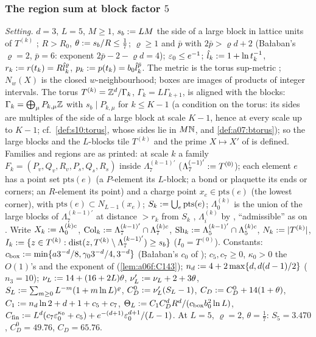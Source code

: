 
\subsubsection*{The region sum \cite[(3.42), Sect.~3C]{Ba2} at block factor $5$}

\emph{Setting.} $d=3$, $L=5$, $M\ge1$, $s_b:= LM$ the side of a large block in lattice units of $T^{(k)}$ \cite[p.~607]{Ba1}; $R>R_0$, $\theta:= s_b/R\le\frac17$; $\varrho\ge1$ and $\bar p$ with $2\bar p>\varrho d+2$ (Ba{\l}aban's $\varrho=2$, $\bar p=6$: exponent $2\bar p-2-\varrho d=4$); $\varepsilon_0\le e^{-1}$; $\hat l_k:=1+\ln t_k^{-1}$, $r_k:= r(t_k)=R\hat l_k^\varrho$, $p_k:= p(t_k)=b_0\hat l_k^{\bar p}$. The metric is the torus sup-metric \cite[(1.3)]{Ba1}; $N_w(X)$ is the closed $w$-neighbourhood; boxes are images of products of integer intervals. The torus $T^{(k)}=\mathbb Z^d/\Gamma_k$, $\Gamma_k=L\Gamma_{k+1}$, is aligned with the blocks: $\Gamma_k=\bigoplus_\mu P_{k,\mu}\mathbb Z$ with $s_b\mid P_{k,\mu}$ for $k\le K-1$ (a condition on the torus: its sides are multiples of the side of a large block at scale $K-1$, hence at every scale up to $K-1$; cf.\ \cref{def:s10:torus}, whose sides lie in $M\mathbb N$, and \cref{def:a07:btorus}); so the large blocks and the $L$-blocks tile $T^{(k)}$ and the prime $X\mapsto X'$ of \cite[(1.16)]{Ba1} is defined. Families and regions are as printed: at scale $k$ a family $F_k=(P_v,Q_v,R_v,P_s,Q_s,R_s)$ inside $\Lambda^{(k-1)'}_7$ ($\Lambda^{(-1)'}_7:= T^{(0)}$); each element $e$ has a point set $\mathrm{pts}(e)$ (a $P$-element its $L$-block; a bond or plaquette its ends or corners; an $R$-element its point) and a charge point $x_e\in\mathrm{pts}(e)$ (the lowest corner), with $\mathrm{pts}(e)\subset N_{L-1}(x_e)$; $S_k:=\bigcup_e\mathrm{pts}(e)$; $\Lambda^{(k)}_0$ is the union of the large blocks of $\Lambda^{(k-1)'}_7$ at distance $>r_k$ from $S_k$ \cite[p.~570]{Ba2}, $\Lambda^{(k)}_i$ by \cite[(2.8)]{Ba2}, ``admissible'' as on \cite[p.~566]{Ba2}. Write $X_k:=\Lambda^{(k)c}_0$, $\mathrm{Col}_k:=\Lambda^{(k-1)'}_7\cap\Lambda^{(k)c}_7$, $\mathrm{Sh}_k:=\Lambda^{(k-1)'}_5\cap\Lambda^{(k)c}_5$, $N_k:=|T^{(k)}|$, $I_k:=\{z\in T^{(k)}:\operatorname{dist}(z,T^{(k)}\setminus\Lambda^{(k-1)'}_7)\ge s_b\}$ ($I_0=T^{(0)}$). Constants: $c_{\mathrm{box}}:=\min\{a3^{-d}/8,\gamma_03^{-d}/4,3^{-d}\}$ (Ba{\l}aban's $c_0$ of \cite[p.~593]{Ba2}); $c_5,c_7\ge0$, $\kappa_0>0$ the $O(1)$'s and the exponent of \cite[(3.42)]{Ba2} (\cref{lem:a06f:C143}); $n_d:=4+2\max\{d,d(d-1)/2\}$ ($n_3=10$); $\nu_L:=14+(16+2L)\theta$, $\nu'_L:=\nu_L+2+3\theta$, $S_L:=\sum_{m\ge0}L^{-m}(1+m\ln L)^\varrho$, $C^0_D:=\nu'_L(S_L-1)$, $C_D:= C^0_D+14(1+\theta)$, $C_1:= n_d\ln2+d+1+c_5+c_7$, $\Theta_L:= C_1C_D^dR^d/(c_{\mathrm{box}}b_0^2\ln L)$, $C_{\mathrm{fin}}:= L^d(c_7\varepsilon_0^{\kappa_0}+c_5)+e^{-(d+1)}\varepsilon_0^{d+1}/(L-1)$. At $L=5$, $\varrho=2$, $\theta=\frac17$: $S_5=3.470$, $C^0_D=49.76$, $C_D=65.76$.

